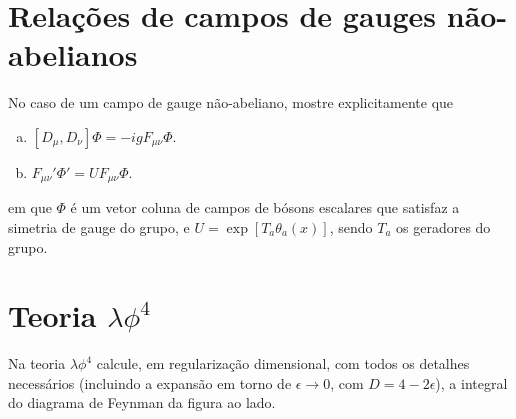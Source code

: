 \documentclass[a4paper, 11pt, oneside]{impression}
\begin{document}


\chapter{Relações de campos de gauges não-abelianos}\label{quest: three}

\begin{exercise}{}
    No caso de um campo de gauge não-abeliano, mostre explicitamente que
    \begin{enumerate}[(a)]
        \item $[D_{\mu}, D_{\nu}]\Phi = -igF_{\mu\nu}\Phi$.
        \item $F_{\mu\nu}' \Phi' = UF_{\mu\nu}\Phi$.
    \end{enumerate}
    em que $\Phi$ é um vetor coluna de campos de bósons escalares que satisfaz a simetria de gauge do grupo, e $U = \exp[T_{a}\theta_{a}(x)]$, sendo $T_{a}$ os geradores do grupo.
\end{exercise}



\chapter{Teoria $\lambda\phi^{4}$}\label{quest: four}

\begin{exercise}{}
    \begin{multicols}{2}
        Na teoria $\lambda\phi^{4}$ calcule, em regularização dimensional, com todos os detalhes necessários (incluindo a expansão em torno de $\epsilon\to0$, com $D = 4-2\epsilon$), a integral do diagrama de Feynman da figura ao lado.
        
        \begin{center}
        \end{center}
        
        
    \end{multicols}
\end{exercise}
\end{document}
